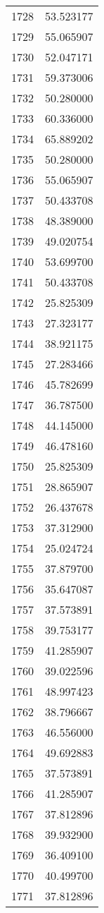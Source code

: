 \documentclass[12pt]{article}
\begin{document}
\begin{longtable}{@{}cc@{}}
1728 & 53.523177 \\
1729 & 55.065907 \\
1730 & 52.047171 \\
1731 & 59.373006 \\
1732 & 50.280000 \\
1733 & 60.336000 \\
1734 & 65.889202 \\
1735 & 50.280000 \\
1736 & 55.065907 \\
1737 & 50.433708 \\
1738 & 48.389000 \\
1739 & 49.020754 \\
1740 & 53.699700 \\
1741 & 50.433708 \\
1742 & 25.825309 \\
1743 & 27.323177 \\
1744 & 38.921175 \\
1745 & 27.283466 \\
1746 & 45.782699 \\
1747 & 36.787500 \\
1748 & 44.145000 \\
1749 & 46.478160 \\
1750 & 25.825309 \\
1751 & 28.865907 \\
1752 & 26.437678 \\
1753 & 37.312900 \\
1754 & 25.024724 \\
1755 & 37.879700 \\
1756 & 35.647087 \\
1757 & 37.573891 \\
1758 & 39.753177 \\
1759 & 41.285907 \\
1760 & 39.022596 \\
1761 & 48.997423 \\
1762 & 38.796667 \\
1763 & 46.556000 \\
1764 & 49.692883 \\
1765 & 37.573891 \\
1766 & 41.285907 \\
1767 & 37.812896 \\
1768 & 39.932900 \\
1769 & 36.409100 \\
1770 & 40.499700 \\
1771 & 37.812896 \\

\end{longtable}
\end{document}
